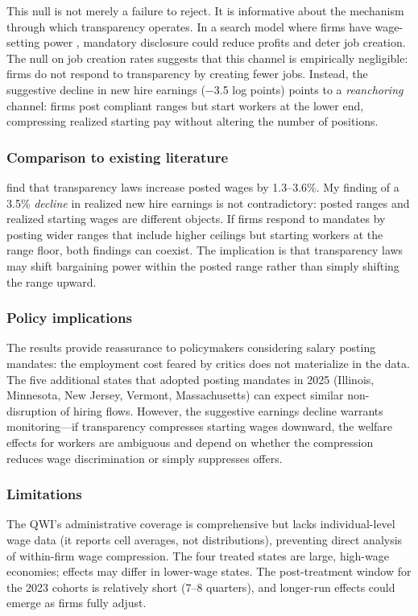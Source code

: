 \documentclass[12pt]{article}
\begin{document}
This null is not merely a failure to reject. It is informative about the mechanism through which transparency operates. In a search model where firms have wage-setting power \citep{burdett1998wage}, mandatory disclosure could reduce profits and deter job creation. The null on job creation rates suggests that this channel is empirically negligible: firms do not respond to transparency by creating fewer jobs. Instead, the suggestive decline in new hire earnings ($-$3.5 log points) points to a \textit{reanchoring} channel: firms post compliant ranges but start workers at the lower end, compressing realized starting pay without altering the number of positions.

\subsubsection*{Comparison to existing literature} \citet{cullen2024equilibrium} find that transparency laws increase posted wages by 1.3--3.6\%. My finding of a 3.5\% \textit{decline} in realized new hire earnings is not contradictory: posted ranges and realized starting wages are different objects. If firms respond to mandates by posting wider ranges that include higher ceilings but starting workers at the range floor, both findings can coexist. The implication is that transparency laws may shift bargaining power within the posted range rather than simply shifting the range upward.

\subsubsection*{Policy implications} The results provide reassurance to policymakers considering salary posting mandates: the employment cost feared by critics does not materialize in the data. The five additional states that adopted posting mandates in 2025 (Illinois, Minnesota, New Jersey, Vermont, Massachusetts) can expect similar non-disruption of hiring flows. However, the suggestive earnings decline warrants monitoring---if transparency compresses starting wages downward, the welfare effects for workers are ambiguous and depend on whether the compression reduces wage discrimination or simply suppresses offers.

\subsubsection*{Limitations} The QWI's administrative coverage is comprehensive but lacks individual-level wage data (it reports cell averages, not distributions), preventing direct analysis of within-firm wage compression. The four treated states are large, high-wage economies; effects may differ in lower-wage states. The post-treatment window for the 2023 cohorts is relatively short (7--8 quarters), and longer-run effects could emerge as firms fully adjust.
\end{document}
